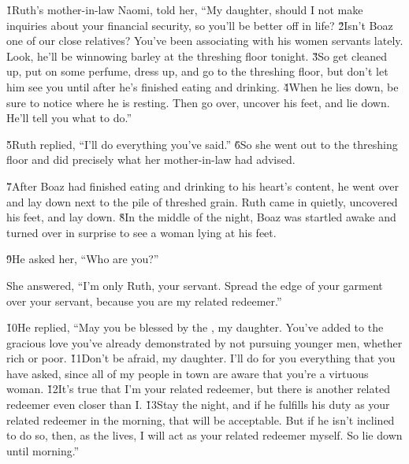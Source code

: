 \v{1}Ruth's mother-in-law Naomi, told her, ``My daughter, should I not make inquiries about your financial security, so you'll be better off in life? \v{2}Isn't Boaz one of our close relatives? You've been associating with his women servants lately. Look, he'll be winnowing barley at the threshing floor tonight. \v{3}So get cleaned up, put on some perfume, dress up, and go to the threshing floor, but don't let him see you until after he's finished eating and drinking. \v{4}When he lies down, be sure to notice where he is resting. Then go over, uncover his feet, and lie down. He'll tell you what to do.''

\v{5}Ruth replied, ``I'll do everything you've said.'' \v{6}So she went out to the threshing floor and did precisely what her mother-in-law had advised.

\v{7}After Boaz had finished eating and drinking to his heart's content, he went over and lay down next to the pile of threshed grain. Ruth came in quietly, uncovered his feet, and lay down. \v{8}In the middle of the night, Boaz was startled awake and turned over in surprise to see a woman lying at his feet.

\v{9}He asked her, ``Who are you?''

She answered, ``I'm only Ruth, your servant. Spread the edge of your garment over your servant, because you are my related redeemer.''

\v{10}He replied, ``May you be blessed by the , my daughter. You've added to the gracious love you've already demonstrated by not pursuing younger men, whether rich or poor. \v{11}Don't be afraid, my daughter. I'll do for you everything that you have asked, since all of my people in town are aware that you're a virtuous woman. \v{12}It's true that I'm your related redeemer, but there is another related redeemer even closer than I. \v{13}Stay the night, and if he fulfills his duty as your related redeemer in the morning, that will be acceptable. But if he isn't inclined to do so, then, as the  lives, I will act as your related redeemer myself. So lie down until morning.''

